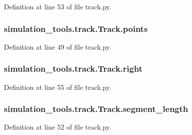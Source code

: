 Definition at line 53 of file track.\+py.

\subsubsection[{\texorpdfstring{points}{points}}]{\setlength{\rightskip}{0pt plus 5cm}simulation\+\_\+tools.\+track.\+Track.\+points}\hypertarget{classsimulation__tools_1_1track_1_1_track_ac6de34747fd382897e7f790cd9faf67c}{}\label{classsimulation__tools_1_1track_1_1_track_ac6de34747fd382897e7f790cd9faf67c}


Definition at line 49 of file track.\+py.

\subsubsection[{\texorpdfstring{right}{right}}]{\setlength{\rightskip}{0pt plus 5cm}simulation\+\_\+tools.\+track.\+Track.\+right}\hypertarget{classsimulation__tools_1_1track_1_1_track_a668e3804fa2720790fb57f592c73c782}{}\label{classsimulation__tools_1_1track_1_1_track_a668e3804fa2720790fb57f592c73c782}


Definition at line 55 of file track.\+py.

\subsubsection[{\texorpdfstring{segment\+\_\+length}{segment_length}}]{\setlength{\rightskip}{0pt plus 5cm}simulation\+\_\+tools.\+track.\+Track.\+segment\+\_\+length}\hypertarget{classsimulation__tools_1_1track_1_1_track_aa74dadec286ae8ad2f3399c6fd9e9fd9}{}\label{classsimulation__tools_1_1track_1_1_track_aa74dadec286ae8ad2f3399c6fd9e9fd9}


Definition at line 52 of file track.\+py.

